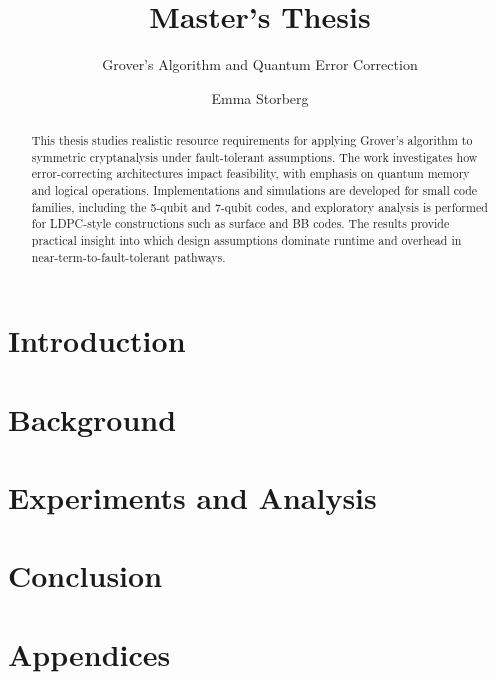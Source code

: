\documentclass[USenglish]{uiomasterthesis}
\title{Master's Thesis}
\subtitle{Grover's Algorithm and Quantum Error Correction}
\author{Emma Storberg}
\begin{document}
\uiomasterfp[
	dept={Department of Physics},
	program={Computational Science: Physics},
	supervisor={TBD},
	long
]

\frontmatter{}
\begin{abstract}
This thesis studies realistic resource requirements for applying Grover's algorithm to symmetric cryptanalysis under fault-tolerant assumptions.
The work investigates how error-correcting architectures impact feasibility, with emphasis on quantum memory and logical operations.
Implementations and simulations are developed for small code families, including the 5-qubit and 7-qubit codes, and exploratory analysis is performed for LDPC-style constructions such as surface and BB codes.
The results provide practical insight into which design assumptions dominate runtime and overhead in near-term-to-fault-tolerant pathways.
\end{abstract}

\tableofcontents{}
\listoffigures{}
\listoftables{}

\mainmatter{}
\part{Introduction}

\part{Background}

\part{Experiments and Analysis}


\part{Conclusion}

\part{Appendices}
\appendix
{}



\backmatter{}
\printbibliography{}
\end{document}
